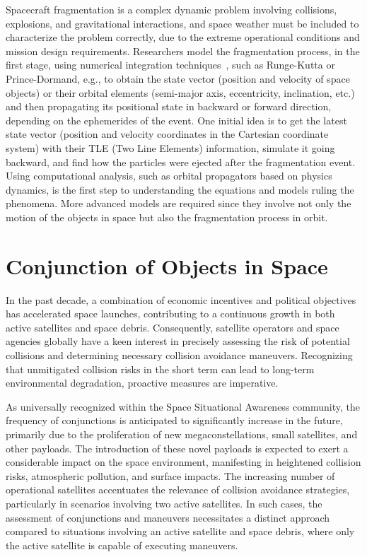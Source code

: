 \documentclass[letterpaper, paper,11pt]{AAS}
\begin{document}
Spacecraft fragmentation is a complex dynamic problem involving collisions, explosions, and gravitational interactions, and space weather must be included to characterize the problem correctly, due to the extreme operational conditions and mission design requirements. Researchers model the fragmentation process, in the first stage, using numerical integration techniques~\cite{isoletta_orbital_2021}, such as Runge-Kutta or Prince-Dormand, e.g., to obtain the state vector (position and velocity of space objects) or their orbital elements (semi-major axis, eccentricity, inclination, etc.) and then propagating its positional state in backward or forward direction, depending on the ephemerides of the event. One initial idea is to get the latest state vector (position and velocity coordinates in the Cartesian coordinate system) with their TLE (Two Line Elements) information, simulate it going backward, and find how the particles were ejected after the fragmentation event. Using computational analysis, such as orbital
propagators based on physics dynamics, is the first step to understanding the equations and models ruling the phenomena. More advanced models are required since they involve not only the motion of the objects in space but also the fragmentation process in orbit.

\section{Conjunction of Objects in Space}

In the past decade, a combination of economic incentives and political objectives has accelerated space launches, contributing to a continuous growth in both active satellites and space debris. Consequently, satellite operators and space agencies globally have a keen interest in precisely assessing the risk of potential collisions and determining necessary collision avoidance maneuvers. Recognizing that unmitigated collision risks in the short term can lead to long-term environmental degradation, proactive measures are imperative.

As universally recognized within the Space Situational Awareness community, the frequency of conjunctions is anticipated to significantly increase in the future, primarily due to the proliferation of new megaconstellations, small satellites, and other payloads. The introduction of these novel payloads is expected to exert a considerable impact on the space environment, manifesting in heightened collision risks, atmospheric pollution, and surface impacts. The increasing number of operational satellites accentuates the relevance of collision avoidance strategies, particularly in scenarios involving two active satellites. In such cases, the assessment of conjunctions and maneuvers necessitates a distinct approach compared to situations involving an active satellite and space debris, where only the active satellite is capable of executing maneuvers.~\cite{oltrogge_collision_2016}
\end{document}
